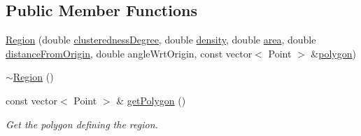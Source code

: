 \subsection*{Public Member Functions}
\begin{DoxyCompactItemize}
\item 
\hyperlink{classmultiscale_1_1analysis_1_1Region_a4f4d296d1a4cbeb10690da7af5ba91d2}{Region} (double \hyperlink{classmultiscale_1_1analysis_1_1SpatialEntityPseudo3D_a22a84312e7c497cc5fbc4d8b41d8fd45}{clusteredness\-Degree}, double \hyperlink{classmultiscale_1_1analysis_1_1SpatialEntityPseudo3D_aedf807816f8c2f7cd961acfe0042fc56}{density}, double \hyperlink{classmultiscale_1_1analysis_1_1SpatialEntityPseudo3D_a1621d5b3ece663bf4c5501940e860292}{area}, double \hyperlink{classmultiscale_1_1analysis_1_1SpatialEntityPseudo3D_a056f67b90ed41c0e6dc4df31b71ad906}{distance\-From\-Origin}, double angle\-Wrt\-Origin, const vector$<$ Point $>$ \&\hyperlink{classmultiscale_1_1analysis_1_1Region_a40d1b47f30bb09c6a47521a968163b6d}{polygon})
\item 
\hyperlink{classmultiscale_1_1analysis_1_1Region_a3c3670fff78f7511d156e3b2f0bc6266}{$\sim$\-Region} ()
\item 
const vector$<$ Point $>$ \& \hyperlink{classmultiscale_1_1analysis_1_1Region_a60e366526dfda2852871c29b70010fb7}{get\-Polygon} ()
\begin{DoxyCompactList}\small\item\em Get the polygon defining the region. \end{DoxyCompactList}\end{DoxyCompactItemize}
